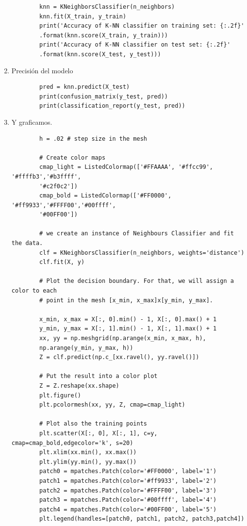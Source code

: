 \documentclass{article}
\begin{document}
\begin{enumerate}
\begin{verbatim}
        knn = KNeighborsClassifier(n_neighbors)
        knn.fit(X_train, y_train)
        print('Accuracy of K-NN classifier on training set: {:.2f}'
        .format(knn.score(X_train, y_train)))
        print('Accuracy of K-NN classifier on test set: {:.2f}'
        .format(knn.score(X_test, y_test)))
    \end{verbatim}
    \item Precisión del modelo
    \begin{verbatim}
        pred = knn.predict(X_test)
        print(confusion_matrix(y_test, pred))
        print(classification_report(y_test, pred))
    \end{verbatim}
    \item Y graficamos.
    \begin{verbatim}
        h = .02 # step size in the mesh

        # Create color maps
        cmap_light = ListedColormap(['#FFAAAA', '#ffcc99', '#ffffb3','#b3ffff',
        '#c2f0c2'])
        cmap_bold = ListedColormap(['#FF0000', '#ff9933','#FFFF00','#00ffff',
        '#00FF00'])

        # we create an instance of Neighbours Classifier and fit the data.
        clf = KNeighborsClassifier(n_neighbors, weights='distance')
        clf.fit(X, y)

        # Plot the decision boundary. For that, we will assign a color to each
        # point in the mesh [x_min, x_max]x[y_min, y_max].

        x_min, x_max = X[:, 0].min() - 1, X[:, 0].max() + 1
        y_min, y_max = X[:, 1].min() - 1, X[:, 1].max() + 1
        xx, yy = np.meshgrid(np.arange(x_min, x_max, h),
        np.arange(y_min, y_max, h))
        Z = clf.predict(np.c_[xx.ravel(), yy.ravel()])

        # Put the result into a color plot
        Z = Z.reshape(xx.shape)
        plt.figure()
        plt.pcolormesh(xx, yy, Z, cmap=cmap_light)

        # Plot also the training points
        plt.scatter(X[:, 0], X[:, 1], c=y, cmap=cmap_bold,edgecolor='k', s=20)
        plt.xlim(xx.min(), xx.max())
        plt.ylim(yy.min(), yy.max())
        patch0 = mpatches.Patch(color='#FF0000', label='1')
        patch1 = mpatches.Patch(color='#ff9933', label='2')
        patch2 = mpatches.Patch(color='#FFFF00', label='3')
        patch3 = mpatches.Patch(color='#00ffff', label='4')
        patch4 = mpatches.Patch(color='#00FF00', label='5')
        plt.legend(handles=[patch0, patch1, patch2, patch3,patch4])


\end{verbatim}
\end{enumerate}
\end{document}
